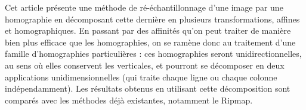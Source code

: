 
Cet article présente une méthode de ré-échantillonnage d'une image par une homographie en décomposant cette dernière en plusieurs transformations, affines et homographiques. En passant par des affinités qu'on peut traiter de manière bien plus efficace que les homographies, on se ramène donc au traitement d'une famille d'homographies particulières : ces homographies seront unidirectionnelles, au sens où elles conservent les verticales, et pourront se décomposer en deux applications unidimensionnelles (qui traite chaque ligne ou chaque colonne indépendamment). Les résultats obtenus en utilisant cette décomposition sont comparés avec les méthodes déjà existantes, notamment le Ripmap.
